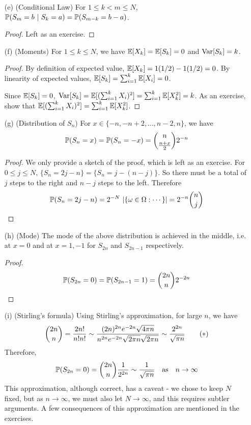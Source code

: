 \documentclass[main]{subfiles}
\begin{document}
\begin{obs}
\begin{enumerate}
            \begin{proof}
                Left as an exercise.
            \end{proof}

            \item[(e)](Conditional Law) For $ 1\le k<m\le N $, $ \P(S_m=b\ |\ S_k=a)=\P(S_{m-k}=b-a) $.

            \begin{proof}
                Left as an exercise.
            \end{proof}

            \item[(f)](Moments) For $ 1\le k\le N $, we have $ \E[X_k]=\E[S_k]=0 $ and $ \var[S_k]=k $.

            \begin{proof}
                By definition of expected value, $ \E[X_k]= 1(1/2) -1(1/2) =0 $. By linearity of expected values, $ \E[S_k]=\sum_{i=1}^k\E[X_i]=0 $.

                Since $ \E[S_k]=0 $, $ \var[S_k]=\E[(\sum_{i=1}^kX_i)^2]=\sum_{i=1}^k\E[X_k^2]=k$. As an exercise, show that $ \E[(\sum_{i=1}^kX_i)^2]=\sum_{i=1}^k\E[X_k^2] $.
            \end{proof}

            \item[(g)](Distribution of $ S_n $) For $ x\in\{-n, -n+2, \ldots, n-2, n\} $, we have \[\P(S_n=x)=\P(S_n=-x)=\binom{n}{\frac{n+x}{2}}2^{-n}\]

            \begin{proof}
                We only provide a sketch of the proof, which is left as an exercise. For $ 0\le j\le N $, $ \{S_n=2j-n\}=\{S_n=j-(n-j)\} $. So there must be a total of $ j $ steps to the right and $ n-j $ steps to the left. Therefore \[\P(S_n=2j-n)=2^{-N}\ |\{\o\in\O:\cdots\}|=2^{-n}\binom{n}{j}\]
            \end{proof}

            \item[(h)](Mode) The mode of the above distribution is achieved in the middle, i.e. at $ x=0 $ and at $ x=1,-1 $ for $ S_{2n} $ and $ S_{2n-1} $ respectively.

            \begin{proof}
                \[\P(S_{2n}=0)=\P(S_{2n-1}=1)=\binom{2n}{n}2^{-2n}\]
            \end{proof}

            \item[(i)](Stirling's formula) Using Stirling's approximation, for large $ n $, we have
            \[\binom{2n}{n}=\f{2n!}{n!n!}\sim\f{(2n)^{2n}e^{-2n}\sqrt{4\pi n}}{n^{2n}e^{-2n}\sqrt{2\pi n}\sqrt{2\pi n}}\sim\f{2^{2n}}{\sqrt{\pi n}}\tag{$ \ast $}\]
            Therefore,
            \[\P(S_{2n}=0)=\binom{2n}{n}\f{1}{2^{2n}}\sim\f{1}{\sqrt{\pi n}}\text{\quad as\quad $ n\to\infty $}\]
            This approximation, although correct, has a caveat - we chose to keep $ N $ fixed, but as $ n\to\infty $, we must also let $ N\to\infty $, and this requires subtler arguments. A few consequences of this approximation are mentioned in the exercises.\\


\end{enumerate}
\end{obs}
\end{document}
